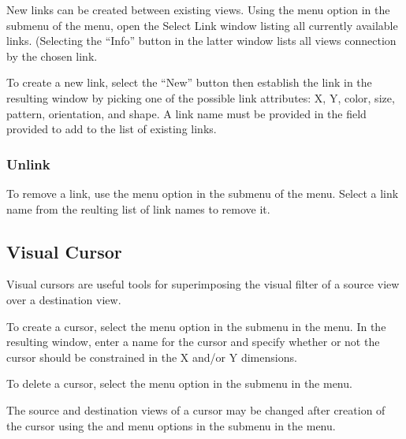 New links can be created between existing views. Using the  menu
option in the  submenu of the  menu, open the Select Link
window listing all currently available links. (Selecting the ``Info'' button in
the latter window lists all views connection by the chosen link.

To create a new link, select the ``New'' button then establish the link in the
resulting window by picking one of the possible link attributes: X, Y, color,
size, pattern, orientation, and shape. A link name must be provided in the field
provided to add to the list of existing links.

\subsubsection{Unlink}

To remove a link, use the  menu option in the  submenu
of the  menu. Select a link name from the reulting list of link names
to remove it.


\subsection{Visual Cursor}


Visual cursors are useful tools for superimposing the visual filter of a source
view over a destination view.

To create a cursor, select the  menu option in the 
submenu in the  menu. In the resulting window, enter a name for the
cursor and specify whether or not the cursor should be constrained in the X
and/or Y dimensions.

To delete a cursor, select the  menu option in the 
submenu in the  menu. 

The source and destination views of a cursor may be changed after creation of
the cursor using the  and  menu options
in the  submenu in the  menu.



